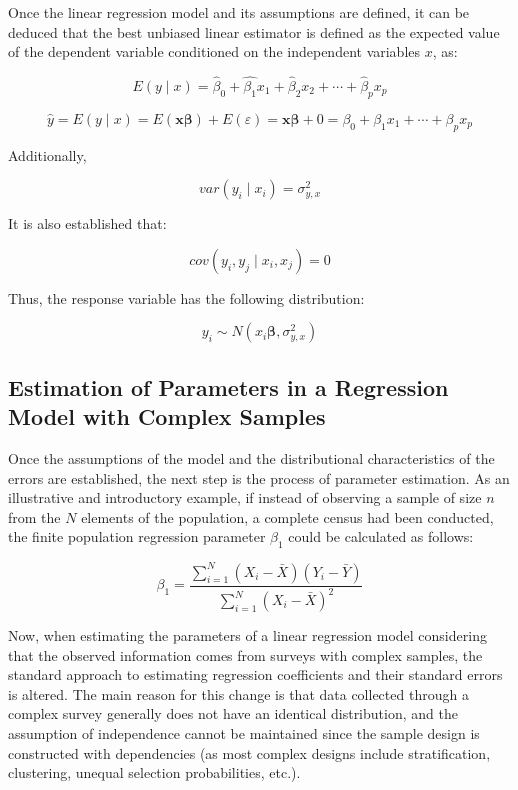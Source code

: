 \documentclass[
  12pt,
]{book}
\begin{document}
Once the linear regression model and its assumptions are defined, it can be deduced that the best unbiased linear estimator is defined as the expected value of the dependent variable conditioned on the independent variables \(x\), as:

\[
E\left(y\mid x\right)=\hat{\beta}_{0}+\hat{\beta_{1}}x_{1}+\hat{\beta}_{2}x_{2}+\cdots+\hat{\beta}_{p}x_{p}
\]

\[
\hat{y}  =  E\left(y\mid x\right)
 =  E\left(\boldsymbol{x}\boldsymbol{\beta}\right)+E\left(\varepsilon\right)
=  \boldsymbol{x}\boldsymbol{\beta}+0
  =  \beta_{0}+\beta_{1}x_{1}+\cdots+\beta_{p}x_{p}
\]

Additionally,

\[
var\left(y_{i}\mid x_{i}\right)  =  \sigma_{y,x}^{2}
\]

It is also established that:

\[
cov\left(y_{i},y_{j}\mid x_{i},x_{j}\right)  = 0
\]

Thus, the response variable has the following distribution:

\[
y_{i}  \sim  N\left(x_{i}\boldsymbol{\beta},\sigma_{y,x}^{2}\right)
\]

\hypertarget{estimation-of-parameters-in-a-regression-model-with-complex-samples}{%
\subsection{Estimation of Parameters in a Regression Model with Complex Samples}\label{estimation-of-parameters-in-a-regression-model-with-complex-samples}}

Once the assumptions of the model and the distributional characteristics of the errors are established, the next step is the process of parameter estimation. As an illustrative and introductory example, if instead of observing a sample of size \(n\) from the \(N\) elements of the population, a complete census had been conducted, the finite population regression parameter \(\beta_{1}\) could be calculated as follows:

\[
\beta_{1}  =  \frac{{ \sum_{i=1}^{N}\left(X_{i}-\bar{X}\right)\left(Y_{i}-\bar{Y}\right)}}{\sum_{i=1}^{N}\left(X_{i}-\bar{X}\right)^{2}}
\]

Now, when estimating the parameters of a linear regression model considering that the observed information comes from surveys with complex samples, the standard approach to estimating regression coefficients and their standard errors is altered. The main reason for this change is that data collected through a complex survey generally does not have an identical distribution, and the assumption of independence cannot be maintained since the sample design is constructed with dependencies (as most complex designs include stratification, clustering, unequal selection probabilities, etc.).
\end{document}
